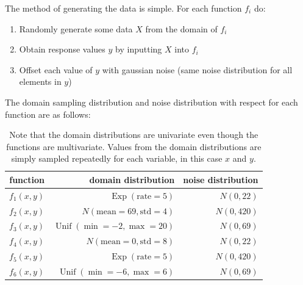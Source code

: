 \documentclass[12pt]{article}
\begin{document}
        The method of generating the data is simple. For each function $f_i$ do:
        \begin{enumerate}
            \item Randomly generate some data $X$ from the domain of $f_i$
            \item Obtain response values $y$ by inputting $X$ into $f_i$
            \item Offset each value of $y$ with gaussian noise (same noise distribution for all elements in $y$)
        \end{enumerate}

        The domain sampling distribution and noise distribution with respect for each function are as follows:
        \begin{table}[H]
            \centering
            \caption{Note that the domain distributions are univariate even though the functions are multivariate. Values from the domain distributions are simply sampled repeatedly for each variable, in this case $x$ and $y$.}
            \begin{tabular}{crr}
                \toprule
                function & domain distribution & noise distribution \\ 
                \midrule
                $f_1(x,y)$ & $\operatorname{Exp}(\text{rate}=5)$    & $N(0,22)$  \\
                $f_2(x,y)$ & $N(\text{mean}=69, \text{std}=4)$      & $N(0,420)$ \\
                $f_3(x,y)$ & $\operatorname{Unif}(\min=-2,\max=20)$ & $N(0,69)$  \\ 
                $f_4(x,y)$ & $N(\text{mean}=0, \text{std}=8)$       & $N(0,22)$  \\
                $f_5(x,y)$ & $\operatorname{Exp}(\text{rate}=5)$    & $N(0,420)$ \\
                $f_6(x,y)$ & $\operatorname{Unif}(\min=-6,\max=6)$  & $N(0,69)$  \\
                \bottomrule
            \end{tabular}
        \end{table}
\end{document}
